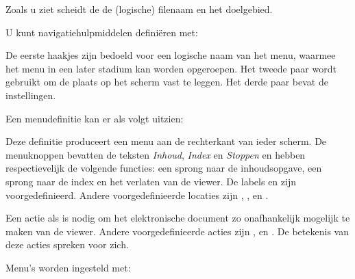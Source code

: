 Zoals u ziet scheidt de \type{::} de (logische) filenaam
en het doelgebied.


U kunt navigatiehulpmiddelen defini\"eren met:


De eerste haakjes zijn bedoeld voor een logische naam van
het menu, waarmee het menu in een later stadium kan worden
opgeroepen. Het tweede paar wordt gebruikt om de plaats op
het scherm vast te leggen. Het derde paar bevat de
instellingen.

Een menudefinitie kan er als volgt uitzien:

\startbuffer
\stelkleurenin
  [status=start]

\stelinteractiein
  [status=start,
   menu=aan]


\stopbuffer

\typebuffer

Deze definitie produceert een menu aan de rechterkant van
ieder scherm. De menuknoppen bevatten de teksten {\em
Inhoud}, {\em Index} en {\em Stoppen} en hebben
respectievelijk de volgende functies: een sprong naar de
inhoudsopgave, een sprong naar de index en het verlaten van
de viewer. De labels  en  zijn
voorgedefinieerd. Andere voorgedefinieerde locaties zijn
, ,
 en .

Een actie als  is nodig om het
elektronische document zo onafhankelijk mogelijk te maken
van de viewer. Andere voorgedefinieerde acties zijn
,  en
. De betekenis van deze acties spreken
voor zich.

Menu's worden ingesteld met:


\stoponderdeel

